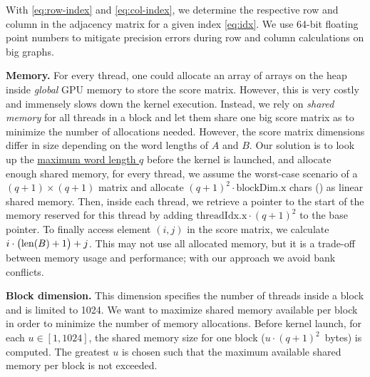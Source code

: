 With \eqref{eq:row-index} and \eqref{eq:col-index}, we determine the respective row and column in the adjacency matrix for a given index \eqref{eq:idx}. We use 64-bit floating point numbers to mitigate precision errors during row and column calculations on big graphs.

\textbf{Memory.} For every thread, one could allocate an array of arrays on the heap inside \textit{global} GPU memory to store the score matrix. However, this is very costly and immensely slows down the kernel execution. Instead, we rely on \textit{shared memory} for all threads in a block and let them share one big score matrix as to minimize the number of allocations needed. However, the score matrix dimensions differ in size depending on the word lengths of $A$ and $B$. Our solution is to look up the \underline{maximum word length $q$} before the kernel is launched, and allocate enough shared memory, \ie for every thread, we assume the worst-case scenario of a $(q+1)\times(q+1)$ matrix and allocate $(q+1)^2 \cdot \text{blockDim.x}$ chars () as linear shared memory. Then, inside each thread, we retrieve a pointer to the start of the memory reserved for this thread by adding $\text{threadIdx.x} \cdot (q+1)^2$ to the base pointer. To finally access element $(i,j)$ in the score matrix, we calculate $i\cdot \bigl(\text{len}(B) + 1\bigr) + j$. This may not use all allocated memory, but it is a trade-off between memory usage and performance; with our approach we avoid bank conflicts.

\textbf{Block dimension.} This dimension specifies the number of threads inside a block and is limited to 1024. We want to maximize shared memory available per block in order to minimize the number of memory allocations. Before kernel launch, for each $u\in [1,1024]$, the shared memory size for one block ($u\cdot (q+1)^2$~bytes) is computed. The greatest $u$ is chosen such that the maximum available shared memory per block is not exceeded.
